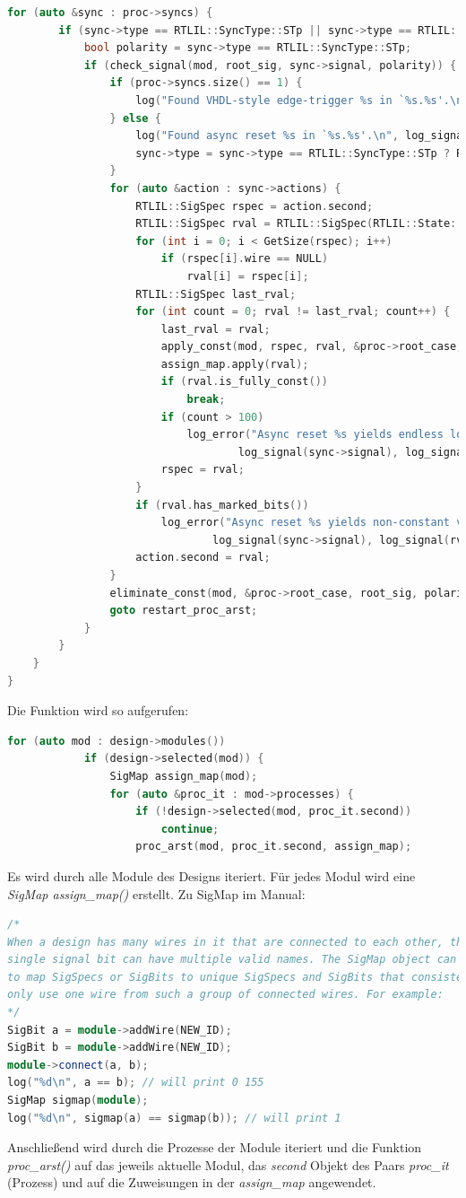 \documentclass[11pt]{report}
\begin{document}
\begin{enumerate}
\begin{lstlisting}[language=C++]
	for (auto &sync : proc->syncs) {
		if (sync->type == RTLIL::SyncType::STp || sync->type == RTLIL::SyncType::STn) {
			bool polarity = sync->type == RTLIL::SyncType::STp;
			if (check_signal(mod, root_sig, sync->signal, polarity)) {
				if (proc->syncs.size() == 1) {
					log("Found VHDL-style edge-trigger %s in `%s.%s'.\n", log_signal(sync->signal), mod->name.c_str(), proc->name.c_str());
				} else {
					log("Found async reset %s in `%s.%s'.\n", log_signal(sync->signal), mod->name.c_str(), proc->name.c_str());
					sync->type = sync->type == RTLIL::SyncType::STp ? RTLIL::SyncType::ST1 : RTLIL::SyncType::ST0;
				}
				for (auto &action : sync->actions) {
					RTLIL::SigSpec rspec = action.second;
					RTLIL::SigSpec rval = RTLIL::SigSpec(RTLIL::State::Sm, rspec.size());
					for (int i = 0; i < GetSize(rspec); i++)
						if (rspec[i].wire == NULL)
							rval[i] = rspec[i];
					RTLIL::SigSpec last_rval;
					for (int count = 0; rval != last_rval; count++) {
						last_rval = rval;
						apply_const(mod, rspec, rval, &proc->root_case, root_sig, polarity, false);
						assign_map.apply(rval);
						if (rval.is_fully_const())
							break;
						if (count > 100)
							log_error("Async reset %s yields endless loop at value %s for signal %s.\n",
									log_signal(sync->signal), log_signal(rval), log_signal(action.first));
						rspec = rval;
					}
					if (rval.has_marked_bits())
						log_error("Async reset %s yields non-constant value %s for signal %s.\n",
								log_signal(sync->signal), log_signal(rval), log_signal(action.first));
					action.second = rval;
				}
				eliminate_const(mod, &proc->root_case, root_sig, polarity);
				goto restart_proc_arst;
			}
		}
	}
}
\end{lstlisting}
Die Funktion wird so aufgerufen:
\begin{lstlisting}[language=C++]
for (auto mod : design->modules())
			if (design->selected(mod)) {
				SigMap assign_map(mod);
				for (auto &proc_it : mod->processes) {
					if (!design->selected(mod, proc_it.second))
						continue;
					proc_arst(mod, proc_it.second, assign_map);
\end{lstlisting}
Es wird durch alle Module des Designs iteriert. Für jedes Modul wird eine \textit{SigMap assign\_map()} erstellt.
Zu SigMap im Manual:
\begin{lstlisting}[language=C++]
/*
When a design has many wires in it that are connected to each other, then a
single signal bit can have multiple valid names. The SigMap object can be used
to map SigSpecs or SigBits to unique SigSpecs and SigBits that consistently
only use one wire from such a group of connected wires. For example:
*/
SigBit a = module->addWire(NEW_ID);
SigBit b = module->addWire(NEW_ID);
module->connect(a, b);
log("%d\n", a == b); // will print 0 155
SigMap sigmap(module);
log("%d\n", sigmap(a) == sigmap(b)); // will print 1
\end{lstlisting}
Anschließend wird durch die Prozesse der Module iteriert und die Funktion \textit{proc\_arst()} auf das jeweils aktuelle Modul, das \textit{second} Objekt des Paars \textit{proc\_it} (Prozess) und auf die Zuweisungen in der \textit{assign\_map} angewendet.


\end{enumerate}
\end{document}
